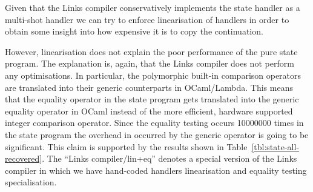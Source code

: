 \documentclass[12pt,mscres,cdtppar,twoside,openright,logo,rightchapter,normalheadings]{infthesis}
\theoremstyle{definition}
\begin{document}
Given that the Links compiler conservatively implements the state
handler as a multi-shot handler we can try to enforce linearisation of
handlers in order to obtain some insight into how expensive it is to
copy the continuation.

However, linearisation does not explain the poor performance of the
pure state program. The explanation is, again, that the Links compiler
does not perform any optimisations. In particular, the polymorphic
built-in comparison operators are translated into their generic
counterparts in OCaml/Lambda. This means that the equality operator in
the state program gets translated into the generic equality operator
in OCaml instead of the more efficient, hardware supported integer
comparison operator. Since the equality testing occurs 10000000 times
in the state program the overhead in occurred by the generic operator
is going to be significant. This claim is supported by the results
shown in Table~\ref{tbl:state-all-recovered}. The ``Links
compiler/lin+eq'' denotes a special version of the Links compiler in
which we have hand-coded handlers linearisation and equality testing
specialisation.
\end{document}
